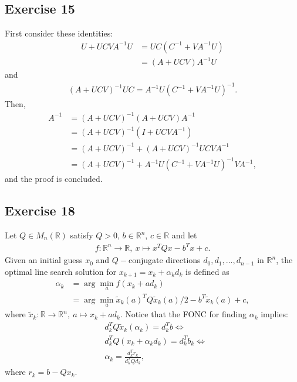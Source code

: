 \documentclass[11.5pt, letterpaper, bibtotoc,
    tablecaptionabove, figurecaptionabove]{article}
\begin{document}
\subsection*{Exercise 15}
First consider these identities:
\begin{align*}
    U + UCVA^{-1}U&=UC(C^{-1}+VA^{-1}U)\\
    &=(A+UCV)A^{-1}U
\end{align*}
and
\begin{align*}
    (A+UCV)^{-1}UC=A^{-1}U(C^{-1}+VA^{-1}U)^{-1}.
\end{align*}
Then,
\begin{align*}
    A^{-1}&=(A+UCV)^{-1}(A+UCV)A^{-1}\\
    &=(A+UCV)^{-1}(I+UCVA^{-1})\\
    &=(A+UCV)^{-1}+(A+UCV)^{-1}UCVA^{-1}\\
    &=(A+UCV)^{-1}+A^{-1}U(C^{-1}+VA^{-1}U)^{-1}VA^{-1},
\end{align*}
and the proof is concluded.

\subsection*{Exercise 18}
Let $Q\in M_n(\mathbb R)$ satisfy $Q>0$,
$b\in\mathbb R^n$, $c\in\mathbb R$ and let
\begin{align*}
    f:\mathbb R^n\to\mathbb R,\ x\mapsto x^TQx-b^Tx+c.
\end{align*}
Given an initial guess $x_0$ and $Q-$conjugate directions $d_0,d_1,\ldots,d_{n-1}$
in $\mathbb R^n$, the optimal line search solution for
$x_{k+1}=x_k+\alpha_k d_k$ is defined as
\begin{align*}
    \alpha_k &= \arg\min_a f(x_k+ad_k)\\
    &=\arg\min_a \tilde{x}_k(a)^TQ\tilde{x}_k(a)/2-b^T\tilde{x}_k(a)+c,
\end{align*}
where $\tilde{x}_k:\mathbb R\to\mathbb R^n,\ a\mapsto x_k+ad_k$.
Notice that the FONC for finding $\alpha_k$ implies:
\begin{align*}
    &d_k^TQ\tilde{x}_k(\alpha_k)=d_k^Tb\Longleftrightarrow\\
    &d_k^TQ(x_k+\alpha_kd_k)=d_k^Tb_k\Longleftrightarrow\\
    &\alpha_k=\frac{d_k^Tr_k}{d_k^TQd_k},
\end{align*}
where $r_k=b-Qx_k$.

\end{document}
